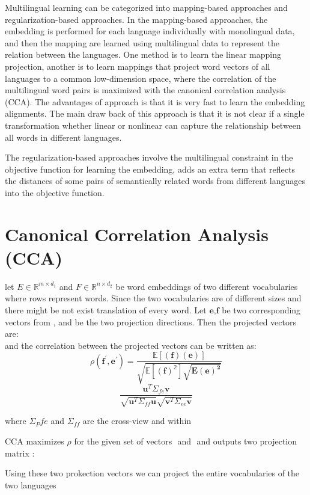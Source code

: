 Multilingual learning can be categorized into mapping-based approaches and regularization-based approaches. In the mapping-based approaches, the embedding is performed for each language individually with monolingual data, and then the mapping are learned using multilingual data to represent the relation between the languages. One method is to learn the linear mapping projection, another is to learn mappings that project word vectors of all languages to a common low-dimension space, where the correlation of the multilingual word pairs is maximized with the canonical correlation analysis (CCA). The advantages of approach is that it is very fast to learn the embedding alignments. The main draw back of this approach is that it is not clear if a single transformation whether linear or nonlinear can capture the relationship between all words in different languages.

The regularization-based approaches involve the multilingual constraint in the objective function for learning the embedding, adds an extra term that reflects the distances of some pairs of semantically related words from different languages into the objective function. 

\section{Canonical Correlation Analysis (CCA)}

let $E \in \mathbb{R}^{m \times d_1}$ and $F \in \mathbb{R}^{n \times d_2}$ be word embeddings of two different vocabularies where rows represent words. Since the two vocabularies are of different sizes and there might be not exist translation of every word. Let $\bm{e}$,$\bm{f}$ be two corresponding vectors from , and be the two projection directions. Then the projected vectors are:
\[ \] 
and the correlation between the projected vectors can be written as:
 \[\rho(\bm{f}^{\prime}, \bm{e}^{\prime}) = \frac{\mathbb{E[(\bm{f})(\bm{e})]}}{\sqrt{\mathbb{E[(\bm{f})^2]} \sqrt{\bm{E(\bm{e})^2}}}}\] 
 \[ \frac{\bm{u}^T\Sigma_{fe} \bm{v}}{\sqrt{\bm{u}^T \Sigma_{ff}\bm{u}} \sqrt{\bm{v}^T\Sigma_{ee}\bm{v}}} \]
 
 where $\Sigma_P{fe}$ and $\Sigma_{ff}$ are the cross-view and within 
 
 CCA maximizes $\rho$ for the given set of vectors ${}$ and ${}$ and outputs two projection matrix :
 
 Using these two prokection vectors we can project the entire vocabularies of the two languages  
 
